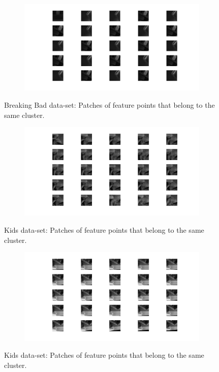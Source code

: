 \documentclass{paper}
\begin{document}
\begin{figure}[H]
\centering
\begin{subfigure}{1.0\textwidth}
\includegraphics[width=\textwidth]{figures/vocabulary/bb/bbVoca1174}
\end{subfigure}
\caption{Breaking Bad data-set: Patches of feature points that belong to the same cluster.}
\label{fig:bb_word_2}
\end{figure}

\begin{figure}[H]
\centering
\begin{subfigure}{1.0\textwidth}
\includegraphics[width=\textwidth]{figures/vocabulary/kids/voca888}
\end{subfigure}
\caption{Kids data-set: Patches of feature points that belong to the same cluster.}
\label{fig:kids_word_1}
\end{figure}

\begin{figure}[H]
\centering
\begin{subfigure}{1.0\textwidth}
\includegraphics[width=\textwidth]{figures/vocabulary/kids/voca1302}
\end{subfigure}
\caption{Kids data-set: Patches of feature points that belong to the same cluster.}
\label{fig:kids_word_2}
\end{figure}
\end{document}
